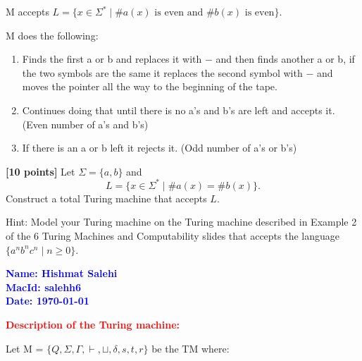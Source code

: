 \documentclass[11pt,fleqn]{article}
\newcommand{\set}[1]{{\{ #1 \}}}
\begin{document}
M accepts $L = \set{x \in \Sigma^* \mid \#a(x) \text{ is even and } \#b(x) \text{ is even}}.$

M does the following: 
\begin{enumerate}
\item Finds the first a or b and replaces it with $-$ and then finds another a or b, if the two symbols are the same it replaces the second symbol with $-$ and moves the pointer all the way to the beginning of the tape.
\item Continues doing that until there is no a's and b's are left and accepts it. (Even number of a's and b's)
\item If there is an a or b left it rejects it. (Odd number of a's or b's)
\end{enumerate}

\newpage

  \item \textbf{[10 points]} Let $\Sigma = \set{a,b}$ and \[L = \set{x
    \in \Sigma^* \mid \#a(x) = \#b(x)}.\] Construct a total Turing
    machine that accepts $L$.  

    Hint: Model your Turing machine on the Turing machine described in
    Example 2 of the 6 Turing Machines and Computability slides that
    accepts the language $\set{a^nb^nc^n \mid n \ge 0}$.

  \bigskip

  \textcolor{blue}{\textbf{Name: Hishmat Salehi \\
MacId: salehh6 \\
Date: \today}}

  \textcolor{red}{\textbf{Description of the Turing machine:}}

Let M = $\set{Q, \Sigma, \Gamma, \vdash, \sqcup, \delta, s, t, r}$ be the TM where: 
\end{document}
